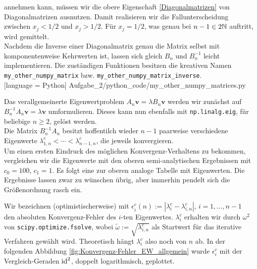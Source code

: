 annehmen kann, müssen wir die obere Eigenschaft \eqref{Diagonalmatrizen} von Diagonalmatrizen ausnutzen. Damit realisieren wir die Fallunterscheidung zwischen $x_j < 1/2$ und $x_j > 1/2$. Für $x_j = 1/2$, was genau bei $n-1 \in 2 \mathbb{N}$ auftritt, wird gemittelt. \\

Nachdem die Inverse einer Diagonalmatrix genau die Matrix selbst mit komponentenweise Kehrwerten ist, lassen sich gleich $B_n$ und $B_n^{-1}$ leicht implementieren. Die zuständigen Funktionen besitzen die kreativen Namen \verb|my_other_numpy_matrix| bzw. \verb|my_other_numpy_matrix_inverse|. \\


[language = Python]
{Aufgabe_2/python_code/my_other_numpy_matrices.py}
\vspace{10pt}

Das verallgemeinerte Eigenwertproblem $A_n \mathbf{v} = \lambda B_n \mathbf{v}$ werden wir zunächst auf $B_n^{-1} A_n \mathbf{v} = \lambda \mathbf{v}$ umformulieren. Dieses kann nun ebenfalls mit \verb|np.linalg.eig|, für beliebige $n \geq 2$, gelöst werden. \\

Die Matrix $B_n^{-1} A_n$ besitzt hoffentilch wieder $n-1$ paarweise verschiedene Eigenwerte $\lambda^c_{1, n} < \cdots < \lambda^c_{n-1, n}$, die jeweils konvergieren. \\

Um einen ersten Eindruck des möglichen Konvergenz-Verhaltens zu bekommen, vergleichen wir die Eigenwerte mit den oberen semi-analytischen Ergebnissen mit $c_0 = 100$, $c_1 = 1$. Es folgt eine zur oberen analoge Tabelle mit Eigenwerten. Die Ergebnisse lassen zwar zu wünschen übrig, aber immerhin pendelt sich die Größenordnung rasch ein. \\


\vspace{10pt}

Wir bezeichnen (optimistischerweise) mit $\epsilon_i^c(n) := |\lambda_i^c - \lambda_{i, n}^c|$, $i = 1, \ldots, n-1$ den absoluten Konvergenz-Fehler des $i$-ten Eigenwertes. $\lambda_i^c$ erhalten wir durch $\omega^2$ von \verb|scipy.optimize.fsolve|, wobei $\tilde{\omega} := \sqrt{\lambda_{i, n}^c}$ als Startwert für das iterative Verfahren gewählt wird. Theoretisch hängt $\lambda_i^c$ also noch von $n$ ab. In der folgenden Abbildung \ref{fig:Konvergenz-Fehler_EW_allgemein} wurde $\epsilon^c_i$ mit der Vergleich-Geraden $\mathrm{id}^2$, doppelt logarithmisch, geplottet. \\

